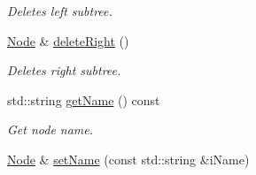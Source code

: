 \begin{DoxyCompactItemize}
\begin{DoxyCompactList}\small\item\em Deletes left subtree. \end{DoxyCompactList}\item 
\hypertarget{classnode_1_1Node_a00fc2ecb534c80527e8b42f4be3084a5}{\hyperlink{classnode_1_1Node}{Node} \& \hyperlink{classnode_1_1Node_a00fc2ecb534c80527e8b42f4be3084a5}{delete\-Right} ()}\label{classnode_1_1Node_a00fc2ecb534c80527e8b42f4be3084a5}

\begin{DoxyCompactList}\small\item\em Deletes right subtree. \end{DoxyCompactList}\item 
\hypertarget{classnode_1_1Node_abd035403eb1ce41e220f036595717d98}{std\-::string \hyperlink{classnode_1_1Node_abd035403eb1ce41e220f036595717d98}{get\-Name} () const }\label{classnode_1_1Node_abd035403eb1ce41e220f036595717d98}

\begin{DoxyCompactList}\small\item\em Get node name. \end{DoxyCompactList}\item 
\hypertarget{classnode_1_1Node_a6cec5b63d685d29a2d849336a8d6f8d2}{\hyperlink{classnode_1_1Node}{Node} \& \hyperlink{classnode_1_1Node_a6cec5b63d685d29a2d849336a8d6f8d2}{set\-Name} (const std\-::string \&i\-Name)}\label{classnode_1_1Node_a6cec5b63d685d29a2d849336a8d6f8d2}


\end{DoxyCompactItemize}
